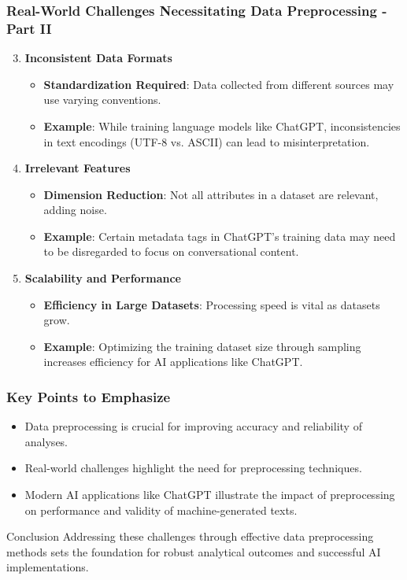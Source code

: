 \documentclass[aspectratio=169]{beamer}
\begin{document}
\begin{frame}[fragile]
    \frametitle{Real-World Challenges Necessitating Data Preprocessing - Part II}
    \begin{enumerate}
        \setcounter{enumi}{2} %
        \item \textbf{Inconsistent Data Formats}
        \begin{itemize}
            \item \textbf{Standardization Required}: Data collected from different sources may use varying conventions.
            \item \textbf{Example}: While training language models like ChatGPT, inconsistencies in text encodings (UTF-8 vs. ASCII) can lead to misinterpretation.
        \end{itemize}
        
        \item \textbf{Irrelevant Features}
        \begin{itemize}
            \item \textbf{Dimension Reduction}: Not all attributes in a dataset are relevant, adding noise.
            \item \textbf{Example}: Certain metadata tags in ChatGPT's training data may need to be disregarded to focus on conversational content.
        \end{itemize}
        
        \item \textbf{Scalability and Performance}
        \begin{itemize}
            \item \textbf{Efficiency in Large Datasets}: Processing speed is vital as datasets grow.
            \item \textbf{Example}: Optimizing the training dataset size through sampling increases efficiency for AI applications like ChatGPT.
        \end{itemize}
    \end{enumerate}
\end{frame}

\begin{frame}[fragile]
    \frametitle{Key Points to Emphasize}
    \begin{itemize}
        \item Data preprocessing is crucial for improving accuracy and reliability of analyses.
        \item Real-world challenges highlight the need for preprocessing techniques.
        \item Modern AI applications like ChatGPT illustrate the impact of preprocessing on performance and validity of machine-generated texts.
    \end{itemize}

    \begin{block}{Conclusion}
        Addressing these challenges through effective data preprocessing methods sets the foundation for robust analytical outcomes and successful AI implementations.
    \end{block}
\end{frame}
\end{document}
